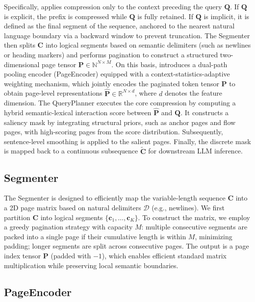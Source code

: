 \documentclass[11pt]{article}
\newcommand{\ours}{\text{BEAVER}\xspace}
\begin{document}
Specifically, \ours applies compression only to the context preceding the query $\mathbf{Q}$. If $\mathbf{Q}$ is explicit, the prefix is compressed while $\mathbf{Q}$ is fully retained. If $\mathbf{Q}$ is implicit, it is defined as the final segment of the sequence, anchored to the nearest natural language boundary via a backward window to prevent truncation. 
The Segmenter then splits $\mathbf{C}$ into logical segments based on semantic delimiters (such as newlines or heading markers) and performs pagination to construct a structured two-dimensional page tensor $\mathbf{P}\in \mathbb{N}^{N\times M}$. On this basis, \ours introduces a dual-path pooling encoder (PageEncoder) equipped with a context-statistics-adaptive weighting mechanism, which jointly encodes the paginated token tensor $\mathbf{P}$ to obtain page-level representations $\hat{\mathbf{P}}\in \mathbb{R}^{N\times d}$, where $d$ denotes the feature dimension.  
The QueryPlanner executes the core compression by computing a hybrid semantic-lexical interaction score between $\hat{\mathbf{P}}$ and $\mathbf{Q}$. It constructs a saliency mask by integrating structural priors, such as anchor pages and flow pages, with high-scoring pages from the score distribution. Subsequently, sentence-level smoothing is applied to the salient pages. Finally, the discrete mask is mapped back to a continuous subsequence $\tilde{\mathbf{C}}$ for downstream LLM inference.


\subsection{Segmenter}
\label{subsec:segmenter}

The Segmenter is designed to efficiently map the variable-length sequence $\mathbf{C}$ into a 2D page matrix based on natural delimiters $\mathcal{D}$ (e.g., newlines). We first partition $\mathbf{C}$ into logical segments $\{\mathbf{c}_1,\dots,\mathbf{c}_K\}$. To construct the matrix, we employ a greedy pagination strategy with capacity $M$: multiple consecutive segments are packed into a single page if their cumulative length is within $M$, minimizing padding; longer segments are split across consecutive pages. The output is a page index tensor $\mathbf{P}$ (padded with $-1$), which enables efficient standard matrix multiplication while preserving local semantic boundaries.

\subsection{PageEncoder}
\label{subsec:pageencoder}
\end{document}
